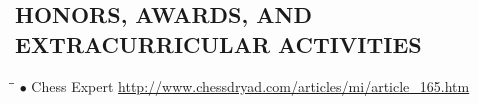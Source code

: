 \documentclass{resume}
\begin{document}
\begin{resume}
\section{HONORS, AWARDS, AND EXTRACURRICULAR ACTIVITIES} 
\vspace{-0.05mm}
\begin{tabbing}
\hspace{2.3in}\= \hspace{2.6in}\= \kill
$\bullet$ Chess Expert \url{http://www.chessdryad.com/articles/mi/article_165.htm}
\end{tabbing}
\end{resume}
%
\end{document}
